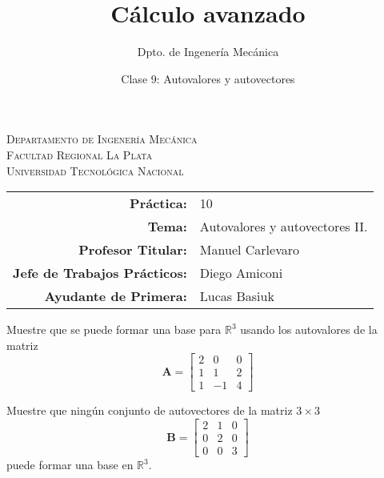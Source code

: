 \documentclass[11pt]{article}
\title{Cálculo avanzado}
\author{Dpto. de Ingenería Mecánica}
\date{Clase 9: Autovalores y autovectores}
\begin{document}

\begin{center}
\end{center} 

\begin{center}
\vspace{\baselineskip}
\Large{\textsc{Departamento de Ingenería Mecánica}} \\
\textsc{Facultad Regional La Plata} \\
\textsc{Universidad Tecnológica Nacional}
\end{center}


\begin{center}
\begin{tabular}{r l}
    \textbf{Práctica:} & 10 \\
 \textbf{Tema:} & Autovalores y autovectores II. \\
 \textbf{Profesor Titular:} & Manuel Carlevaro \\
 \textbf{Jefe de Trabajos Prácticos:} & Diego Amiconi \\
 \textbf{Ayudante de Primera:} & Lucas Basiuk 
\end{tabular}\end{center}

\vspace{1em}
\begin{question} %
    Muestre que se puede formar una base para $\mathbb{R}^3$ usando los autovalores de la matriz
    \[ \bm{A} = \begin{bmatrix} 2 & 0 & 0 \\
        1 & 1 & 2 \\
    1 & -1 & 4 \end{bmatrix} \]
\end{question}

\begin{question} %
Muestre que ningún conjunto de autovectores de la matriz $3 \times 3$
\[ \bm{B} = \begin{bmatrix} 2 & 1 & 0 \\
           0 & 2 & 0 \\
       0 & 0 & 3 \end{bmatrix} \]
       puede formar una base en $\mathbb{R}^3$.
\end{question}
\end{document}
